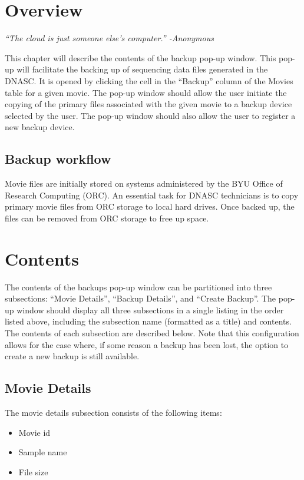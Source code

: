 
\section{Overview}

\vspace{3mm}
\emph{``The cloud is just someone else's computer.'' -Anonymous}
\vspace{3mm}

\noindent This chapter will describe the contents of the backup pop-up window.
This pop-up will facilitate the backing up of sequencing data files generated 
in the DNASC. It is opened by clicking the cell in the ``Backup'' column of the 
Movies table for a given movie. The pop-up window should allow the user initiate 
the copying of the primary files associated with the given movie to a backup device 
selected by the user. The pop-up window should also allow the user to register a new 
backup device.

\subsection{Backup workflow}
Movie files are initially stored on systems administered by the BYU Office of 
Research Computing (ORC). An essential task for DNASC technicians is to copy primary 
movie files from ORC storage to local hard drives. Once backed up, the files can be 
removed from ORC storage to free up space.

\section{Contents}

The contents of the backups pop-up window can be partitioned into three subsections: 
``Movie Details'', ``Backup Details'', and ``Create Backup''. The pop-up window should 
display all three subsections in a single listing in the order listed above, including 
the subsection name (formatted as a title) and contents. The contents of each subsection 
are described below. Note that this configuration allows for the case where, if some 
reason a backup has been lost, the option to create a new backup is still available.

\subsection{Movie Details}

The movie details subsection consists of the following items:
\begin{itemize}\itemsep1pt
  \item Movie id
  \item Sample name
  \item File size
\end{itemize}

